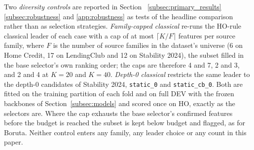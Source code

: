 \documentclass[final,5p,twocolumn]{elsarticle}
\newcommand{\Kfeat}{K}
\providecommand{\DIFaddtex}[1]{{\protect\color{blue} \sf #1}} %
\providecommand{\DIFdeltex}[1]{{\protect\color{red} \scriptsize #1}} %
\providecommand{\DIFaddbegin}{} %
\providecommand{\DIFaddend}{} %
\providecommand{\DIFdelbegin}{} %
\providecommand{\DIFdelend}{} %
\providecommand{\DIFadd}[1]{\texorpdfstring{\DIFaddtex{#1}}{#1}} %
\providecommand{\DIFdel}[1]{\texorpdfstring{\DIFdeltex{#1}}{}} %
\begin{document}
Two \emph{diversity controls} are reported in Section~\DIFdelbegin \DIFdel{\ref{subsec:primary_results} }\DIFdelend \DIFaddbegin \DIFadd{\ref{subsec:robustness} and \ref{app:robustness} }\DIFaddend as tests of the headline comparison rather than as selection strategies. \emph{Family-capped classical} re-runs the HO-rule classical leader of each case with a cap of at most $\lceil \Kfeat/F\rceil$ features per source family, where $F$ is the number of source families in the dataset's universe (6 on Home Credit, 17 on LendingClub and 12 on Stability 2024), the subset filled in the base selector's own ranking order; the caps are therefore 4 and 7, 2 and 3, and 2 and 4 at $\Kfeat=20$ and $\Kfeat=40$. \emph{Depth-0 classical} restricts the same leader to the depth-0 candidates of Stability 2024, \texttt{static\_0} and \texttt{static\_cb\_0}. Both are fitted on the training partition of each fold and on full DEV with the frozen backbones of Section~\ref{subsec:models} and scored once on HO, exactly as the selectors are. Where the cap exhausts the base selector's confirmed features before the budget is reached the subset is kept below budget and flagged, as for Boruta. Neither control enters any family, any leader choice or any count in this paper.
\end{document}
